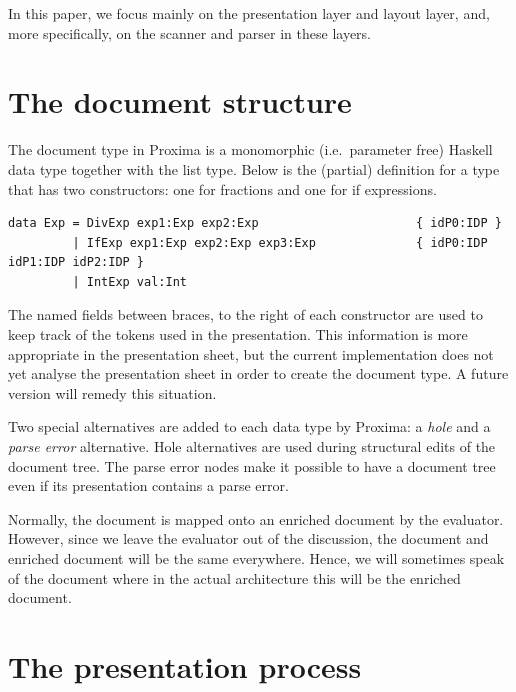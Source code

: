 \documentclass[12pt]{article}
\begin{document}
In this paper, we focus mainly on the presentation layer and layout layer, and, more specifically, on the scanner and parser in these layers.


%
\section{The document structure}\label{sect:document}
%

The document type in Proxima is a monomorphic (i.e.\ parameter free) Haskell data type together with the list type. Below is the (partial) definition for a type  that has two constructors: one for fractions and one for if expressions. 


\begin{footnotesize}
\begin{verbatim}
data Exp = DivExp exp1:Exp exp2:Exp                      { idP0:IDP }
         | IfExp exp1:Exp exp2:Exp exp3:Exp              { idP0:IDP idP1:IDP idP2:IDP }
         | IntExp val:Int
\end{verbatim}
\end{footnotesize}

The named fields between braces, to the right of each constructor are used to keep track of the tokens used in the presentation. This information is more appropriate in the presentation sheet, but the current implementation does not yet analyse the presentation sheet in order to create the document type. A future version will remedy this situation.

Two special alternatives are added to each data type by Proxima: a {\em hole} and a {\em parse error} alternative. Hole alternatives are used during structural edits of the document tree. The parse error nodes make it possible to have a document tree even if its presentation contains a parse error.

Normally, the document is mapped onto an enriched document by the evaluator. However, since we leave the evaluator out of the discussion, the document and enriched document will be the same everywhere. Hence, we will sometimes speak of the document where in the actual architecture this will be the enriched document.




%
\section{The presentation process}
%
\end{document}
